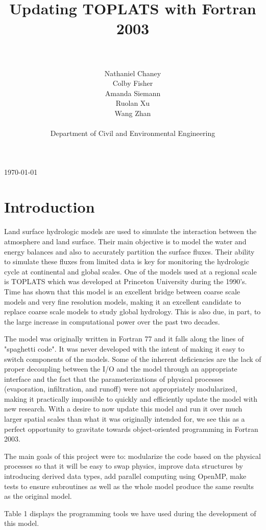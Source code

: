 \documentclass[pdftex,12pt,a4paper]{article}
\title{Updating TOPLATS with Fortran 2003}
\author{\\ \\ Nathaniel Chaney\\ Colby Fisher\\ Amanda Siemann\\ Ruolan Xu\\ Wang Zhan \\ \\ Department of Civil and Environmental Engineering}
\date{}
\begin{document}
\maketitle
\vfill
\begin{center}
{\large \today}
\end{center}

\section{Introduction}
Land surface hydrologic models are used to simulate the interaction between the atmosphere and land surface. Their main objective is to model the water and energy balances and also to accurately partition the surface fluxes. Their ability to simulate these fluxes from limited data is key for monitoring the hydrologic cycle at continental and global scales. One of the models used at a regional scale is TOPLATS which was developed at Princeton University during the 1990's. Time has shown that this model is an excellent bridge between coarse scale models and very fine resolution models, making it an excellent candidate to replace coarse scale models to study global hydrology. This is also due, in part, to the large increase in computational power over the past two decades. 

The model was originally written in Fortran 77 and it falls along the lines of "spaghetti code". It was never developed with the intent of making it easy to switch components of the models. Some of the inherent deficiencies are the lack of proper decoupling between the I/O and the model through an appropriate interface and the fact that the parameterizations of physical processes (evaporation, infiltration, and runoff) were not appropriately modularized, making it practically impossible to quickly and efficiently update the model with new research. With a desire to now update this model and run it over much larger spatial scales than what it was originally intended for, we see this as a perfect opportunity to gravitate towards object-oriented programming in Fortran 2003. 

The main goals of this project were to: modularize the code based on the physical processes so that it will be easy to swap physics, improve data structures by introducing derived data types, add parallel computing using OpenMP, make tests to ensure subroutines as well as the whole model produce the same results as the original model. 

Table 1 displays the programming tools we have used during the development of this model.
\end{document}
